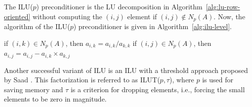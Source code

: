 {The ILU($p$) preconditioner is the LU decomposition in Algorithm\ \ref{alg:lu-row-oriented} without computing the $(i,j)$ element if $(i,j)\notin N_p(A)$. Now, the algorithm of the ILU($p$) preconditioner is given in Algorithm\ \ref{alg:ilu-level}.}
\begin{algorithm}[H]\caption{{The ILU($p$) preconditioner}}\label{alg:ilu-level}\begin{algorithmic}[1]
\State if $(i,k)\in N_p(A)$, then $a_{i,k}=a_{i,k}/a_{k,k}$
\State if $(i,j)\in N_p(A)$, then $a_{i,j}=a_{i,j}-a_{i,k}\times a_{k,j}$
\EndFor\EndFor\EndFor\end{algorithmic}\end{algorithm}
{Another successful variant of ILU is an ILU with a threshold approach proposed by Saad . This factorization is referred to as ILUT($p,\tau$), where $p$ is used for saving memory and $\tau$ is a criterion for dropping elements, i.e., forcing the small elements to be zero in magnitude.}

